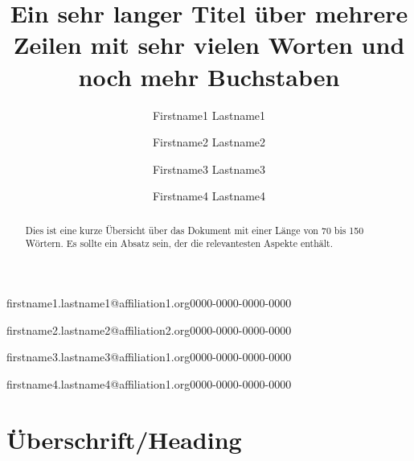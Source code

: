 \documentclass[]{lni}
\begin{document}
\title[Ein Kurztitel]{Ein sehr langer Titel über mehrere Zeilen mit sehr vielen
Worten und noch mehr Buchstaben}
\author[1]{Firstname1 Lastname1}{firstname1.lastname1@affiliation1.org}{0000-0000-0000-0000}
\author[2]{Firstname2 Lastname2}{firstname2.lastname2@affiliation2.org}{0000-0000-0000-0000}
\author[1]{Firstname3 Lastname3}{firstname3.lastname3@affiliation1.org}{0000-0000-0000-0000}
\author[1]{Firstname4 Lastname4}{firstname4.lastname4@affiliation1.org}{0000-0000-0000-0000}%
\maketitle

\begin{abstract}
Dies ist eine kurze Übersicht über das Dokument mit einer Länge von
70 bis 150 Wörtern. Es sollte ein Absatz sein, der die relevantesten
Aspekte enthält.
\end{abstract}
\section{Überschrift/Heading}

\end{document}
